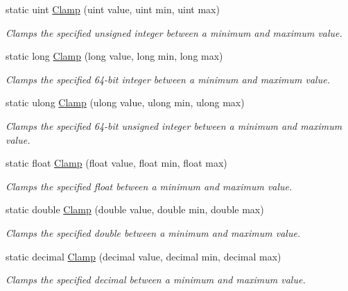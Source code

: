 \begin{DoxyCompactItemize}
static uint \hyperlink{class_tri_devs_1_1_tri_engine_1_1_helpers_1_1_math_a08748ab6a39f02e42fac3f02328eae9c}{Clamp} (uint value, uint min, uint max)
\begin{DoxyCompactList}\small\item\em Clamps the specified unsigned integer between a minimum and maximum value. \end{DoxyCompactList}\item 
static long \hyperlink{class_tri_devs_1_1_tri_engine_1_1_helpers_1_1_math_a5f7d7eb5deaceed9fc0a180a2b9a43bb}{Clamp} (long value, long min, long max)
\begin{DoxyCompactList}\small\item\em Clamps the specified 64-\/bit integer between a minimum and maximum value. \end{DoxyCompactList}\item 
static ulong \hyperlink{class_tri_devs_1_1_tri_engine_1_1_helpers_1_1_math_a780b32cf6761161f71197f88ffe8e073}{Clamp} (ulong value, ulong min, ulong max)
\begin{DoxyCompactList}\small\item\em Clamps the specified 64-\/bit unsigned integer between a minimum and maximum value. \end{DoxyCompactList}\item 
static float \hyperlink{class_tri_devs_1_1_tri_engine_1_1_helpers_1_1_math_a95f317c05504d41f84e6b1bb19dd2fe4}{Clamp} (float value, float min, float max)
\begin{DoxyCompactList}\small\item\em Clamps the specified float between a minimum and maximum value. \end{DoxyCompactList}\item 
static double \hyperlink{class_tri_devs_1_1_tri_engine_1_1_helpers_1_1_math_a91165ec148c5bfbcedcdf8d2f36bbf3f}{Clamp} (double value, double min, double max)
\begin{DoxyCompactList}\small\item\em Clamps the specified double between a minimum and maximum value. \end{DoxyCompactList}\item 
static decimal \hyperlink{class_tri_devs_1_1_tri_engine_1_1_helpers_1_1_math_ac74f18639491c7d04c75441691705200}{Clamp} (decimal value, decimal min, decimal max)
\begin{DoxyCompactList}\small\item\em Clamps the specified decimal between a minimum and maximum value. \end{DoxyCompactList}\end{DoxyCompactItemize}


